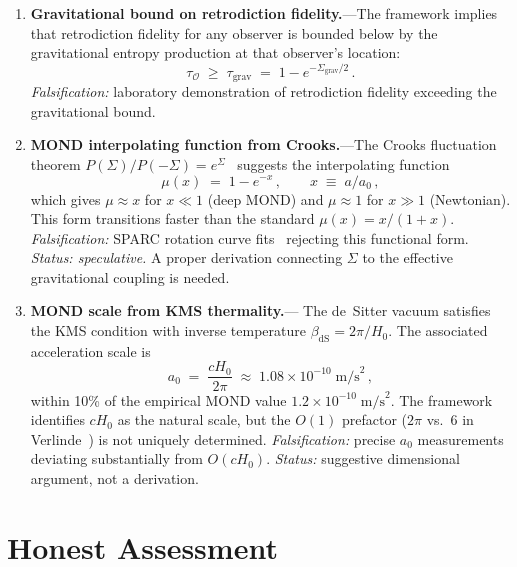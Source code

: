 \documentclass[prd,twocolumn,superscriptaddress,longbibliography,floatfix]{revtex4-2}
\newcommand{\tauasym}{\tau}
\newcommand{\Sgrav}{\Sigma_{\mathrm{grav}}}
\newcommand{\tauO}{\tauasym_{\mathcal{O}}}
\begin{document}
\begin{enumerate}
\item \textbf{Gravitational bound on retrodiction
fidelity.}---The framework implies that retrodiction
fidelity for any observer is bounded below by the
gravitational entropy production at that observer's
location:
\begin{equation}
\tauO \;\geq\; \tauasym_{\mathrm{grav}}
\;=\; 1 - e^{-\Sgrav/2}\,.
\label{eq:retrodiction_bound}
\end{equation}
\emph{Falsification:} laboratory demonstration of
retrodiction fidelity exceeding the gravitational
bound.

\item \textbf{MOND interpolating function from
Crooks.}---The Crooks fluctuation theorem
$P(\Sigma)/P(-\Sigma) = e^{\Sigma}$~\cite{Crooks1999}
suggests the interpolating function
\begin{equation}
\mu(x) \;=\; 1 - e^{-x}\,,\qquad
x \;\equiv\; a/a_0\,,
\label{eq:mu_crooks}
\end{equation}
which gives $\mu \approx x$ for $x \ll 1$ (deep MOND)
and $\mu \approx 1$ for $x \gg 1$ (Newtonian).
This form transitions faster than the standard
$\mu(x) = x/(1+x)$.
\emph{Falsification:} SPARC rotation curve
fits~\cite{SPARC} rejecting this functional form.
\emph{Status: speculative.}  A proper derivation
connecting $\Sigma$ to the effective gravitational
coupling is needed.

\item \textbf{MOND scale from KMS thermality.}---
The de~Sitter vacuum satisfies the KMS condition with
inverse temperature $\beta_{\mathrm{dS}} = 2\pi/H_0$.
The associated acceleration scale is
\begin{equation}
a_0 \;=\; \frac{cH_0}{2\pi}
\;\approx\; 1.08 \times 10^{-10}\;\mathrm{m/s}^2\,,
\label{eq:a0_KMS}
\end{equation}
within 10\% of the empirical MOND value
$1.2 \times 10^{-10}\;\mathrm{m/s}^2$.
The framework identifies $cH_0$ as the natural
scale, but the $O(1)$ prefactor ($2\pi$ vs.\ $6$ in
Verlinde~\cite{Verlinde2016}) is not uniquely
determined.
\emph{Falsification:} precise $a_0$ measurements
deviating substantially from $O(cH_0)$.
\emph{Status:} suggestive dimensional argument,
not a derivation.

\end{enumerate}


\section{Honest Assessment}
\label{sec:honest}
\end{document}
